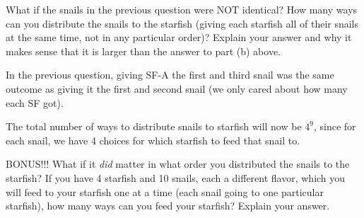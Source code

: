 \documentclass[11pt]{exam}
\begin{document}
\begin{questions}

\question[10] What if the snails in the previous question were NOT identical? How many ways can you distribute the snails to the starfish (giving each starfish all of their snails at the same time, not in any particular order)? Explain your answer and why it makes sense that it is larger than the answer to part (b) above.
\begin{solution}
  In the previous question, giving SF-A the first and third snail was the same outcome as giving it the first and second snail (we only cared about how many each SF got).

  The total number of ways to distribute snails to starfish will now be $4^9$, since for each snail, we have 4 choices for which starfish to feed that snail to.
\end{solution}
\vfill
\vfill




\newpage

\bonusquestion[10] BONUS!!! What if it \emph{did} matter in what order you distributed the snails to the starfish?  If you have 4 starfish and 10 snails, each a different flavor, which you will feed to your starfish one at a time (each snail going to one particular starfish), how many ways can you feed your starfish?  Explain your answer.


\end{questions}
\end{document}
